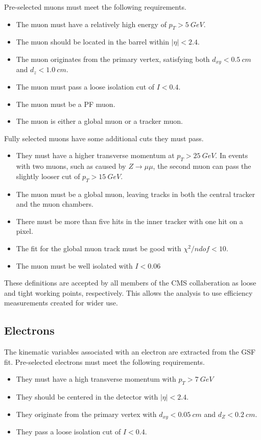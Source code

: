 Pre-selected muons must meet the following requirements.
\begin{itemize}
\item The muon must have a relatively high energy of $p_T > \SI{5}{GeV}$.
\item The muon should be located in the barrel within $|\eta| < 2.4$.
\item The muon originates from the primary vertex, satisfying both
  $d_{xy} < \SI{0.5}{cm}$ and $d_z < \SI{1.0}{cm}$.
\item The muon must pass a loose isolation cut of $I < 0.4$.
\item The muon must be a PF muon.
\item The muon is either a global muon or a tracker muon.
\end{itemize}

Fully selected muons have some additional cuts they must pass.
\begin{itemize}
\item They must have a higher transverse momentum at $p_T > \SI{25}{GeV}$.
  In events with two muons, such as caused by $Z \rightarrow \mu\mu$,
  the second muon can pass the slightly looser cut of $p_T > \SI{15}{GeV}$.
\item The muon must be a global muon, leaving tracks in both the central tracker
  and the muon chambers.
\item There must be more than five hits in the inner tracker with one hit on a pixel.
\item The fit for the global muon track must be good with $\chi^2/ndof < 10$.
\item The muon must be well isolated with $I < 0.06$
\end{itemize}

These definitions are accepted by all members of the CMS collaberation
as loose and tight working points, respectively.
This allows the analysis to use efficiency measurements created for wider use.

\subsection{Electrons} \label{sec:ele-def}

The kinematic variables associated with an electron are extracted from the GSF fit.
Pre-selected electrons must meet the following requirements.
\begin{itemize}
\item They must have a high transverse momentum with $p_T > \SI{7}{GeV}$
\item They should be centered in the detector with $|\eta| < 2.4$.
\item They originate from the primary vertex with
  $d_{xy} < \SI{0.05}{cm}$ and $d_Z < \SI{0.2}{cm}$.
\item They pass a loose isolation cut of $I < 0.4$.
\end{itemize}

